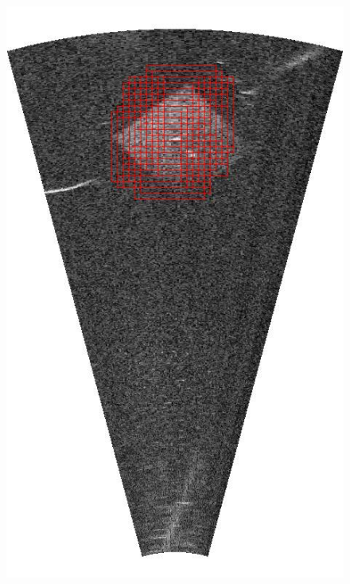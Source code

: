 \begin{figure}[!t]
{        \includegraphics[height=0.2\textheight]{chapters/images/proposals/unseen/detections-rotating-platform.jpg}
}
\end{figure}
